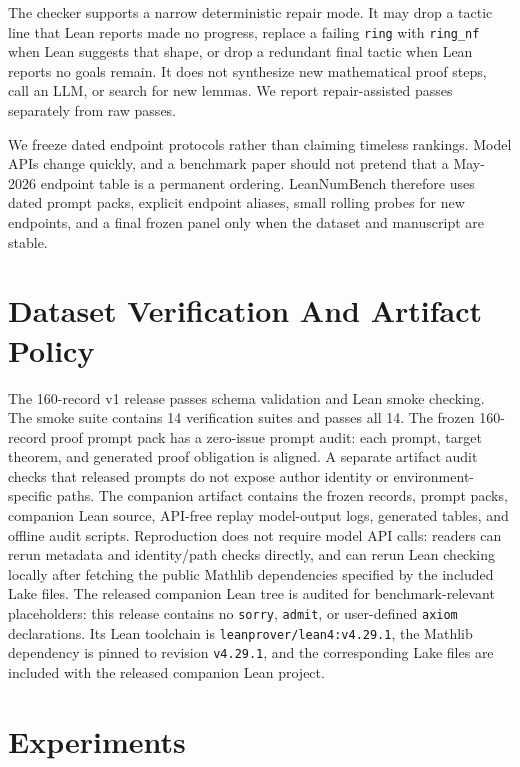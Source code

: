 \documentclass{article}
\begin{document}
The checker supports a narrow deterministic repair mode. It may drop a tactic
line that Lean reports made no progress, replace a failing \texttt{ring} with
\texttt{ring\_nf} when Lean suggests that shape, or drop a redundant final
tactic when Lean reports no goals remain. It does not synthesize new
mathematical proof steps, call an LLM, or search for new lemmas. We report
repair-assisted passes separately from raw passes.

We freeze dated endpoint protocols rather than claiming timeless rankings. Model
APIs change quickly, and a benchmark paper should not pretend that a
May-2026 endpoint table is a permanent ordering. LeanNumBench therefore uses
dated prompt packs, explicit endpoint aliases, small rolling probes for new
endpoints, and a final frozen panel only when the dataset and manuscript are
stable.

\section{Dataset Verification And Artifact Policy}

The 160-record v1 release passes schema validation and Lean smoke
checking. The smoke suite contains 14 verification suites and passes all 14.
The frozen 160-record proof prompt pack has a zero-issue prompt audit: each
prompt, target theorem, and generated proof obligation is aligned. A separate
artifact audit checks that released prompts do not expose author identity or
environment-specific paths.
The companion artifact contains the frozen records, prompt packs,
companion Lean source, API-free replay model-output logs, generated
tables, and offline audit scripts. Reproduction does not require model API
calls: readers can rerun metadata and identity/path checks directly, and can
rerun Lean checking locally after fetching the public Mathlib dependencies
specified by the included Lake files. The released companion Lean tree is
audited for benchmark-relevant placeholders: this release contains no
\texttt{sorry}, \texttt{admit}, or user-defined \texttt{axiom} declarations.
Its Lean toolchain is \texttt{leanprover/lean4:v4.29.1}, the Mathlib
dependency is pinned to revision \texttt{v4.29.1}, and the corresponding Lake
files are included with the released companion Lean project.

\section{Experiments}
\end{document}
